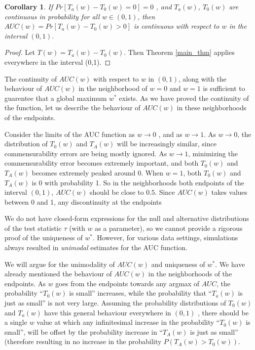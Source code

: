 \documentclass[12pt]{article} %
\newtheorem{cor}{Corollary}
\begin{document}
\begin{cor}{
 If $Pr[T_a(w)-T_0(w)=0]=0$ , and $T_a(w)$, $T_0(w)$ are continuous in probability for all $w \in (0,1)$, then $AUC(w)=Pr\left[T_a(w)-T_0(w) >0 \right]$ is continuous with respect to $w$  in the interval $(0,1)$.}
\end{cor}
\begin{proof}

Let $T(w)=T_a(w)-T_0(w).$ Then Theorem \ref{main_thm} applies everywhere in the interval (0,1).
\end{proof}

The continuity of $AUC(w)$ with respect to $w$ in $(0,1)$, along with the behaviour of $AUC(w)$ in the neighborhood of $w=0$ and $w=1$ is sufficient to guarentee  that a global maximum $w^*$ exists. As we have proved the continuity of the function, let us describe the behaviour of $AUC(w)$ in these neighborhoods of the endpoints. 

Consider the limits of the AUC function as $w\rightarrow 0$ , and as $w\rightarrow 1$. As $w\rightarrow 0$, the distribution of $T_0(w)$ and $T_A(w)$ will be increasingly similar, since commensurability errors are being mostly ignored.  As $w\rightarrow 1$, minimizing  the commensurability error becomes extremely important, and both  $T_0(w)$ and $T_A(w)$ becomes extremely peaked around $0$. When $w=1$, both $T_0(w)$ and $T_A(w)$ is 0 with probability 1.
 So in the neighborhoods both endpoints of  the interval $(0,1)$, $AUC(w)$ should be close to $0.5$. Since $AUC(w)$ takes values between 0 and 1, any discontinuity at  the endpoints 


 We do not have closed-form expressions for the null and alternative distributions of the test statistic $\tau$ (with $w$ as a parameter), so we cannot provide a rigorous proof of the uniqueness of $w^*$. However, for various data settings, simulations always resulted in \emph{unimodal}  estimates for the AUC function.

 We will argue for the unimodality of $AUC(w)$ and uniqueness of $w^*$. We have already mentioned the behaviour of $AUC(w)$ in the neighborhoods of the endpoints. As $w$ goes from the endpoints towards any argmax of $AUC$, the   probability ``$T_0(w)$  is small'' increases,  while the probability that ``$T_a(w)$ is just as small'' is not very large. Assuming the probability distributions of $T_0(w)$ and $T_a(w)$ have this general behaviour everywhere in $ (0,1)$ , there should be a single $w$ value at which any infinitesimal increase in the probability ``$T_0(w)$  is small'', will be offset by the probability increase in  ``$T_A(w)$ is just as small'' (therefore resulting in no increase in the probability $P(T_A(w)>T_0(w))$.
\end{document}
